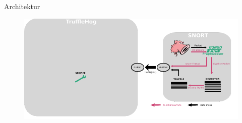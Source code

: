\begin{frame}{Architektur}
    \begin{figure}
    	\centering
    	\includegraphics[width=\textwidth]{./images/arch/8.pdf}
    \end{figure}
\end{frame}
